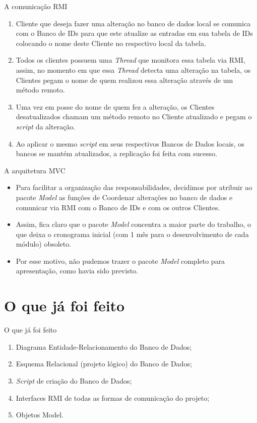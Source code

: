 \documentclass[10pt,brazil]{beamer}
\begin{document}
\begin{frame}{A comunicação RMI}


{\small
		\begin{enumerate}
			\item Cliente que deseja fazer uma alteração no banco de dados local se comunica com o Banco de IDs para que este atualize as entradas em sua tabela de IDs colocando o nome deste Cliente no respectivo local da tabela.

			\item Todos os clientes possuem uma \emph{Thread} que monitora essa tabela via RMI, assim, no momento em que essa \emph{Thread} detecta uma alteração na tabela, os Clientes pegam o nome de quem realizou essa alteração através de um método remoto. 

			\item Uma vez em posse do nome de quem fez a alteração, os Clientes desatualizados chamam um método remoto no Cliente atualizado e pegam o \emph{script} da alteração.

			\item Ao aplicar o mesmo \emph{script} em seus respectivos Bancos de Dados locais, os bancos se mantém atualizados, a replicação foi feita com sucesso.
		\end{enumerate}
		}
\end{frame}


\begin{frame}{A arquitetura MVC}
	\begin{itemize}
	 \item Para facilitar a organização das responsabilidades, decidimos por atribuir ao pacote \emph{Model} as funções de Coordenar alterações no banco de dados e comunicar via RMI com o Banco de IDs e com os outros Clientes.
	 \item Assim, fica claro que o pacote \emph{Model} concentra a maior parte do trabalho, o que deixa o cronograma inicial (com 1 mês para o desenvolvimento de cada módulo) obsoleto.
	 \item Por esse motivo, não pudemos trazer o pacote \emph{Model} completo para apresentação, como havia sido previsto.

	\end{itemize}
\end{frame}


\section{O que já foi feito}
\begin{frame}{O que já foi feito}
	\begin{enumerate}
		\item Diagrama Entidade-Relacionamento do Banco de Dados;
		\item Esquema Relacional (projeto lógico) do Banco de Dados;
		\item \emph{Script} de criação do Banco de Dados;
		\item Interfaces RMI de todas as formas de comunicação do projeto;
		\item Objetos Model.
	\end{enumerate}
\end{frame}	
\end{document}
